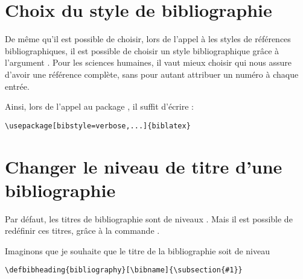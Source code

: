 \section{Choix du style de bibliographie}

De même qu'il est possible de choisir, lors de l'appel à  les styles de références bibliographiques, il est possible de choisir un style bibliographique grâce à l'argument . Pour les sciences humaines, il vaut mieux choisir  qui nous assure d'avoir une référence complète, sans pour autant attribuer un numéro à chaque entrée.

Ainsi, lors de l'appel au package , il suffit d'écrire :

\begin{verbatim}
\usepackage[bibstyle=verbose,...]{biblatex}

\end{verbatim}
\section{Changer le niveau de titre d'une bibliographie}

Par défaut, les titres de bibliographie sont de niveaux . Mais il est possible de redéfinir ces titres, grâce à la commande .

Imaginons que je souhaite que le titre de la bibliographie soit de niveau 

\begin{verbatim}
\defbibheading{bibliography}[\bibname]{\subsection{#1}}
\end{verbatim}

